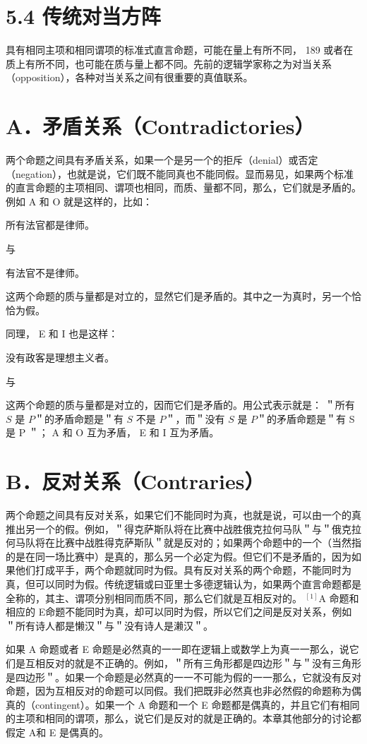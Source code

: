 \section*{5.4 传统对当方阵}
具有相同主项和相同谓项的标准式直言命题，可能在量上有所不同， 189 或者在质上有所不同，也可能在质与量上都不同。先前的逻辑学家称之为对当关系（opposition），各种对当关系之间有很重要的真值联系。

\section*{A．矛盾关系（Contradictories）}
两个命题之间具有矛盾关系，如果一个是另一个的拒斥（denial）或否定（negation），也就是说，它们既不能同真也不能同假。显而易见，如果两个标准的直言命题的主项相同、谓项也相同，而质、量都不同，那么，它们就是矛盾的。例如 A 和 O 就是这样的，比如：

所有法官都是律师。

与

有法官不是律师。

这两个命题的质与量都是对立的，显然它们是矛盾的。其中之一为真时，另一个恰恰为假。

同理， E 和 I 也是这样：

没有政客是理想主义者。

与

这两个命题的质与量都是对立的，因而它们是矛盾的。用公式表示就是： ＂所有 $S$ 是 $P$＂的矛盾命题是＂有 $S$ 不是 $P$＂，而＂没有 $S$ 是 $P$＂的矛盾命题是＂有 S 是 P ＂； A 和 O 互为矛盾， E 和 I 互为矛盾。

\section*{B．反对关系（Contraries）}
两个命题之间具有反对关系，如果它们不能同时为真，也就是说，可以由一个的真推出另一个的假。例如，＂得克萨斯队将在比赛中战胜俄克拉何马队＂与＂俄克拉何马队将在比赛中战胜得克萨斯队＂就是反对的；如果两个命题中的一个（当然指的是在同一场比赛中）是真的，那么另一个必定为假。但它们不是矛盾的，因为如果他们打成平手，两个命题就同时为假。具有反对关系的两个命题，不能同时为真，但可以同时为假。传统逻辑或曰亚里士多德逻辑认为，如果两个直言命题都是全称的，其主、谓项分别相同而质不同，那么它们就是互相反对的。 ${ }^{[1]} \mathrm{A}$ 命题和相应的 E命题不能同时为真，却可以同时为假，所以它们之间是反对关系，例如 ＂所有诗人都是懒汉＂与＂没有诗人是濑汉＂。

如果 A 命题或者 E 命题是必然真的一一即在逻辑上或数学上为真一一那么，说它们是互相反对的就是不正确的。例如，＂所有三角形都是四边形＂与＂没有三角形是四边形＂。如果一个命题是必然真的一一不可能为假的一一那么，它就没有反对命题，因为互相反对的命题可以同假。我们把既非必然真也非必然假的命题称为偶真的（contingent）。如果一个 A 命题和一个 E 命题都是偶真的，并且它们有相同的主项和相同的谓项，那么，说它们是反对的就是正确的。本章其他部分的讨论都假定 A和 E 是偶真的。

